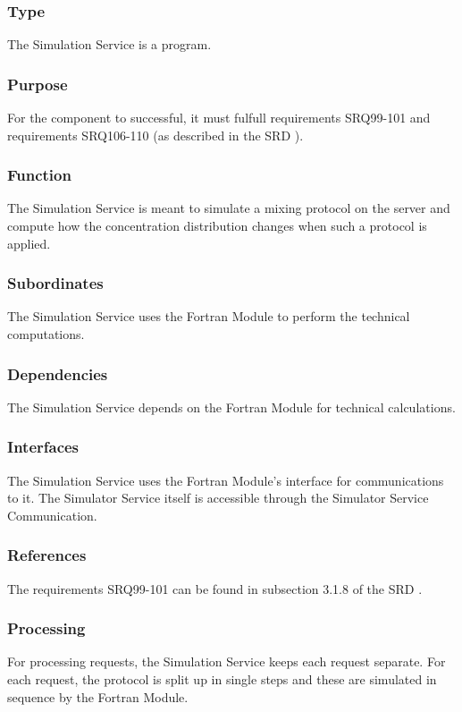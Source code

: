 \subsubsection*{Type}
The Simulation Service is a program.

\subsubsection*{Purpose}
For the component to successful, it must fulfull requirements SRQ99-101 and requirements SRQ106-110 (as described in the SRD \cite{srd}).

\subsubsection*{Function}
The Simulation Service is meant to simulate a mixing protocol on the server and compute how the concentration distribution changes when such a protocol is applied.

\subsubsection*{Subordinates}
The Simulation Service uses the Fortran Module to perform the technical computations.

\subsubsection*{Dependencies}
The Simulation Service depends on the Fortran Module for technical calculations.

\subsubsection*{Interfaces}
The Simulation Service uses the Fortran Module's interface for communications to it. The Simulator Service itself is accessible through the Simulator Service Communication.

\subsubsection*{References}
The requirements SRQ99-101 can be found in subsection 3.1.8 of the SRD \cite{srd}.

\subsubsection*{Processing}
For processing requests, the Simulation Service keeps each request separate. For each request, the protocol is split up in single steps and these are simulated in sequence by the Fortran Module.

